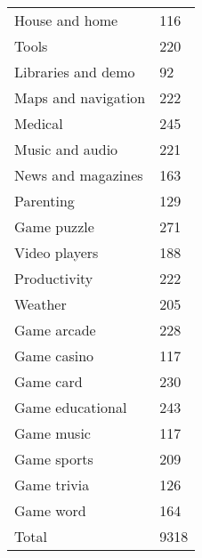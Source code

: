 \begin{longtable}[h!]{ll}
House and home      &   116 \\
Tools               &   220 \\
Libraries and demo  &    92 \\
Maps and navigation &   222 \\
Medical             &   245 \\
Music and audio     &   221 \\
News and magazines  &   163 \\
Parenting           &   129 \\
Game puzzle         &   271 \\
Video players       &   188 \\
Productivity        &   222 \\
Weather             &   205 \\
Game arcade         &   228 \\
Game casino         &   117 \\
Game card           &   230 \\
Game educational    &   243 \\
Game music          &   117 \\
Game sports         &   209 \\
Game trivia         &   126 \\
Game word           &   164 \\
Total               &  9318 \\
\end{longtable}
